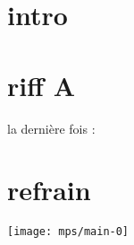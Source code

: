 \documentclass[11pt]{article}
\begin{document}
    \begin{center}
    \end{center}
    \section*{intro}
    


    \section{riff A}
    

    la derni\`ere fois :

    


    \section{refrain}
    \texttt{[image: mps/main-0]}


    \newpage
    




%    


%    
\end{document}
